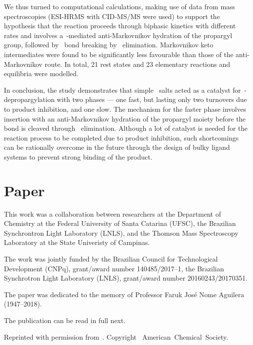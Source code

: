 We thus turned to computational calculations,
making use of data from mass spectroscopies (ESI-HRMS with CID-MS/MS were used) to support the hypothesis
that the reaction proceeds through biphasic kinetics with different rates
and
involves a~-mediated anti-Markovnikov hydration of the propargyl group,
followed by~ bond breaking by~ elimination.
Markovnikov keto intermediates were found to be significantly less favourable than those of the anti-Markovnikov route.
In total,
21 rest states and 23 elementary reactions and equilibria were modelled.

In conclusion,
the study demonstrates that
simple~ salts acted as a catalyst for~-depropargylation with two phases --- one fast,
but lasting only two turnovers due to product inhibition,
and one slow.
The mechanism for the faster phase involves~ insertion
with an anti-Markovnikov hydration of the propargyl moiety before the~ bond is cleaved
through~ elimination.
Although a lot of catalyst is needed for the reaction process to be completed due to product inhibition,
such shortcomings can be rationally overcome in the future
through the design of bulky ligand systems
to prevent strong binding of the product.

\section{Paper}

This work was a collaboration between researchers
at the Department of Chemistry at the Federal University of Santa Catarina (UFSC),
the Brazilian Synchrontron Light Laboratory (LNLS),
and the Thomson Mass Spectroscopy Laboratory at the State Univeristy of Campinas.

The work was jointly funded by the Brazilian Council for Technological Development (CNPq),
grant/award number 140485/2017--1,
the Brazilian Synchrotron Light Laboratory (LNLS),
grant/award number 20160243/20170351.

The paper was dedicated to the memory of Professor Faruk José Nome Aguilera (1947--2018).

The publication can be read in full next.

Reprinted with permission from~.
Copyright~\citeyear{Coelho_2019}
American~Chemical~Society.


